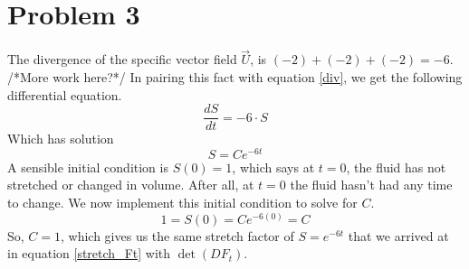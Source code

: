 \documentclass[a4paper]{article}
\newcommand{\der}[2]{\frac{d#1}{d#2}}
\begin{document}
\section{Problem 3}
The divergence of the specific vector field $\vec{U}$, is $(-2)+(-2)+(-2) = -6$. /*More work here?*/ In pairing this fact with equation \ref{div}, we get the following differential equation.
\begin{equation*}
	\der{S}{t} = -6\cdot S
\end{equation*}
Which has solution
\begin{equation*}
S = Ce^{-6t}
\end{equation*}
A sensible initial condition is $S(0) = 1$, which says at $t=0$, the fluid has not stretched or changed in volume. After all, at $t=0$ the fluid hasn't had any time to change. We now implement this initial condition to solve for $C$.
\begin{equation*}
1 = S(0) = Ce^{-6(0)} = C
\end{equation*}
So, $C=1$, which gives us the same stretch factor of $S=e^{-6t}$ that we  arrived at in equation \ref{stretch_Ft} with $\det({DF_t})$.
\end{document}
